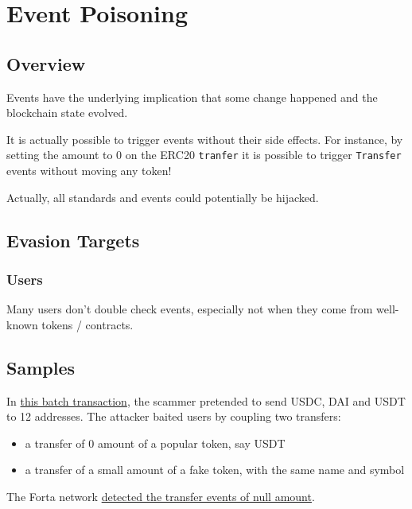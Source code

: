 \section{Event Poisoning} \label{sec:event-poisoning}

\subsection{Overview}

Events have the underlying implication that some change happened and the blockchain state evolved.

It is actually possible to trigger events without their side effects.
For instance, by setting the amount to 0 on the ERC20 \lstinline[language=Solidity]{tranfer} it is possible to trigger \lstinline[language=Solidity]{Transfer} events without moving any token!

Actually, all standards and events could potentially be hijacked.

\subsection{Evasion Targets}

\subsubsection{Users}

Many users don't double check events, especially not when they come from well-known tokens / contracts.

\subsection{Samples}

In \href{https://explorer.phalcon.xyz/tx/polygon/0x8a5f75338bfbf78b0969cdf5bacfe24c65e703ea94b430c470193b3d2a094441?line=1}{this batch transaction}, the scammer pretended to send USDC, DAI and USDT to 12 addresses.
The attacker baited users by coupling two transfers:

\begin{itemize}
\item{a transfer of 0 amount of a popular token, say USDT}
\item{a transfer of a small amount of a fake token, with the same name and symbol}
\end{itemize}

The Forta network \href{https://explorer.forta.network/alerts?limit=20&sort=desc&text=&txHash=0x8a5f75338bfbf78b0969cdf5bacfe24c65e703ea94b430c470193b3d2a094441}{detected the transfer events of null amount}.

